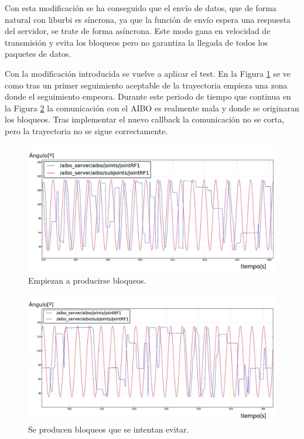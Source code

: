 \documentclass[12pt,a4paper,final,twoside]{book}
\begin{document}
Con esta modificación se ha conseguido que el envío de datos, que de forma natural con liburbi es síncrona, ya que la función de envío espera una respuesta del servidor, se trate de forma asíncrona. Este modo gana en velocidad de transmisión y evita los bloqueos pero no garantiza la llegada de todos los paquetes de datos.

Con la modificación introducida se vuelve a aplicar el test.
En la Figura \ref{fig:ASempiezamala} se ve como tras un primer seguimiento aceptable de la trayectoria empieza una zona donde el seguimiento empeora. Durante este periodo de tiempo que continua en la Figura \ref{fig:ASpeor} la comunicación con el AIBO es realmente mala y donde se originaran los bloqueos. Tras implementar el nuevo callback la comunicación no se corta, pero la trayectoria no se sigue correctamente.

\begin{figure}[H]
	\centering
    \includegraphics[scale=0.26]{images/empiezamala.jpg}
 	\caption{Empiezan a producirse bloqueos.}
  \label{fig:ASempiezamala}
\end{figure}
\begin{figure}[H]
	\centering
    \includegraphics[scale=0.26]{images/peora5hz.jpg}
 	\caption{Se producen bloqueos que se intentan evitar.}
  \label{fig:ASpeor}
\end{figure}
\end{document}
